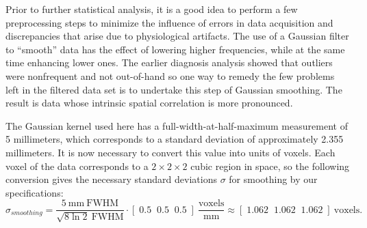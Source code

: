 
\par Prior to further statistical analysis, it is a good idea to perform a few
preprocessing steps to minimize the influence of errors in data acquisition and
discrepancies that arise due to physiological artifacts. The use of a Gaussian
filter to ``smooth'' data has the effect of lowering higher frequencies, while
at the same time enhancing lower ones. The earlier diagnosis analysis showed
that outliers were nonfrequent and not out-of-hand so one way to remedy the few
problems left in the filtered data set is to undertake this step of Gaussian
smoothing. The result is data whose intrinsic spatial correlation is more
pronounced.

\par \indent The Gaussian kernel used here has a full-width-at-half-maximum
measurement of 5 millimeters, which corresponds to a standard deviation of
approximately 2.355 millimeters. It is now necessary to convert this value into
units of voxels. Each voxel of the data corresponds to a $2 \times 2 \times 2$
cubic region in space, so the following conversion gives the necessary standard
deviations $\sigma$ for smoothing by our specifications:
\[
\sigma_{smoothing} = \frac{ 5 \ \mathrm{ mm \ FWHM } }{ \sqrt{ 8 \ln{ 2 } } \
\mathrm{ FWHM } } \cdot \left[ \; 0.5 \; \; 0.5 \; \; 0.5 \; \right] \
\frac{ \mathrm{ voxels } }{ \mathrm{ mm } } \approx
\left[ \; 1.062 \; \; 1.062 \; \; 1.062 \; \right] \ \mathrm{ voxels } .
\]

